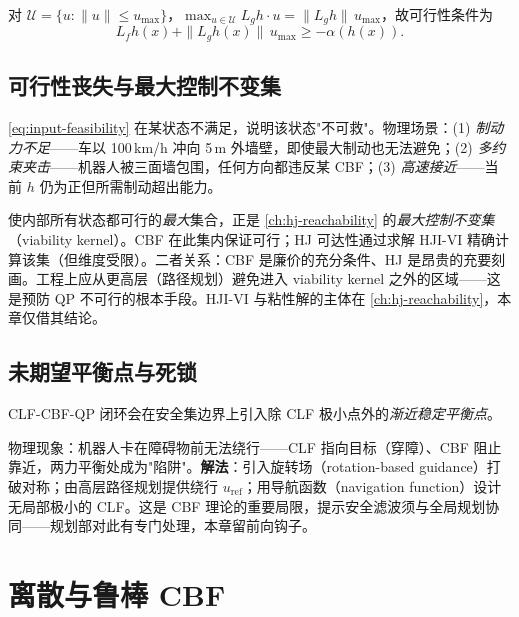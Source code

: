对 $\mathcal U=\{u:\|u\|\le u_{\max}\}$，$\max_{u\in\mathcal U}L_gh\cdot u=\|L_gh\|\,u_{\max}$，故可行性条件为
\begin{equation}
L_fh(x)+\|L_gh(x)\|\,u_{\max}\ge-\alpha(h(x)).
\label{eq:input-feasibility}
\end{equation}

\subsection{可行性丧失与最大控制不变集}

\cref{eq:input-feasibility} 在某状态不满足，说明该状态"不可救"。物理场景：(1) \emph{制动力不足}——车以 100\,km/h 冲向 5\,m 外墙壁，即使最大制动也无法避免；(2) \emph{多约束夹击}——机器人被三面墙包围，任何方向都违反某 CBF；(3) \emph{高速接近}——当前 $h$ 仍为正但所需制动超出能力。

\begin{insight}
使内部所有状态都可行的\emph{最大}集合，正是 \cref{ch:hj-reachability} 的\emph{最大控制不变集}（viability kernel）。CBF 在此集内保证可行；HJ 可达性通过求解 HJI-VI 精确计算该集（但维度受限）。二者关系：CBF 是廉价的充分条件、HJ 是昂贵的充要刻画。工程上应从更高层（路径规划）避免进入 viability kernel 之外的区域——这是预防 QP 不可行的根本手段。HJI-VI 与粘性解的主体在 \cref{ch:hj-reachability}，本章仅借其结论。
\end{insight}

\subsection{未期望平衡点与死锁}

\begin{theorem}\label{thm:undesired-eq}
CLF-CBF-QP 闭环会在安全集边界上引入除 CLF 极小点外的\emph{渐近稳定平衡点}。
\end{theorem}

物理现象：机器人卡在障碍物前无法绕行——CLF 指向目标（穿障）、CBF 阻止靠近，两力平衡处成为"陷阱"。\textbf{解法}：引入旋转场（rotation-based guidance）打破对称；由高层路径规划提供绕行 $u_{\mathrm{ref}}$；用导航函数（navigation function）设计无局部极小的 CLF。这是 CBF 理论的重要局限，提示安全滤波须与全局规划协同——规划部对此有专门处理，本章留前向钩子。

\section{离散与鲁棒 CBF}
\label{sec:cbf-robust}

